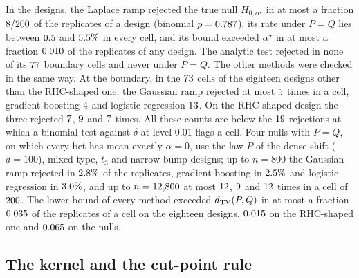 In the designs, the Laplace ramp rejected the true null $H_{0,\alpha^\star}$ in at most a fraction $8/200$ of the
replicates of a design (binomial $p=0.787$), its rate under $P=Q$ lies between $0.5$ and $5.5\%$ in every cell, and its
bound exceeded $\alpha^\star$ in at most a fraction $0.010$ of the replicates of any design. The analytic test
rejected in none of its $77$ boundary cells and never under $P=Q$. The other methods were checked in the
same way. At the boundary, in the $73$ cells of the eighteen designs other than the RHC-shaped one,
the Gaussian ramp rejected at most $5$ times in a cell, gradient boosting $4$ and logistic
regression $13$. On the RHC-shaped design the three rejected $7$, $9$ and
$7$ times. All these counts are below the $19$ rejections at which a binomial test against
$\delta$ at level $0.01$ flags a cell.
Four nulls with $P=Q$, on which every bet has mean exactly $\alpha=0$, use the law $P$ of the dense-shift ($d=100$),
mixed-type, $t_3$ and narrow-bump designs; up to $n=800$ the Gaussian ramp rejected in $2.8\%$ of the
replicates, gradient boosting in $2.5\%$ and logistic regression in $3.0\%$, and up to $n=12{,}800$
at most $12$, $9$ and $12$ times in a cell of
$200$. The lower bound of every method exceeded $d_{\mathrm{TV}}(P,Q)$ in at most a fraction $0.035$ of the
replicates of a cell on the eighteen designs, $0.015$ on the RHC-shaped one and $0.065$ on the
nulls.

\subsection{The kernel and the cut-point rule}
\label{sec:kernelfallback}

